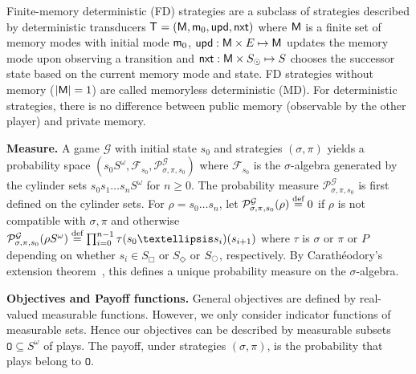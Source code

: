 \documentclass[a4paper,UKenglish,cleveref,autoref,thm-restate]{lipics-v2021}
\newcommand{\+}[1]{\mathbb{#1}}
\newcommand{\?}[1]{\mathcal{#1}}
\newcommand{\x}{\times}
\newcommand{\rsymbol}{\ocircle}
\newcommand{\zsymbol}{\Box}
\newcommand{\osymbol}{\Diamond}
\newcommand{\xsymbol}{\odot}
\newcommand{\zstates}{\states_\zsymbol}
\newcommand{\rstates}{\states_\rsymbol}
\newcommand{\ostates}{\states_\osymbol}
\newcommand{\xstates}{\states_\xsymbol}
\newcommand{\eqby}[2][=]{\stackrel{\text{{\tiny{#2}}}}{#1}}
\newcommand{\eqdef}{\eqby{def}}
\newcommand{\Prob}[2][]{\mathcal{P}^{#1}_{#2}}
\newcommand{\obj}{\mathtt{O}}
\newcommand{\lrc}[1]{\left(#1\right)}
\newcommand{\tuple}[1]{\lrc{#1}}
\newcommand{\game}{{\mathcal G}}
\newcommand{\restrict}{|}
\newcommand{\states}{S}
\newcommand{\s}{s}
\newcommand{\transition}{{E}}
\newcommand{\probp}{P}
\newcommand{\partialplay}{\rho}
\newcommand{\zstrat}{\sigma}
\newcommand{\ostrat}{\pi}
\newcommand{\xstrat}{\tau}
\newcommand{\pz}{\zsymbol}
\newcommand{\po}{\osymbol}
\newcommand{\memory}{{\sf M}}
\newcommand{\updatefun}{upd}
\newcommand{\memconf}{{\sf m}}
\newcommand{\memconfset}{{\sf M}}
\newcommand{\memsuc}{{\sf nxt}}
\newcommand{\memup}{{\sf \updatefun}}
\newcommand{\memstrattuple}{\tuple{\memory,\initmem,\memup,\memsuc}}
\newcommand{\initmem}{\memconf_0}
\newcommand{\memstrat}[1]{{\sf T}^{#1}}
\newcommand{\om}{\omega}
\newcommand{\expectval}{{\mathcal E}}
\newcommand{\expectation}[2][]{ \expectval^{#1}_{#2}}
\newcommand{\F}{{\mathcal F}}
\begin{document}
Finite-memory deterministic (FD) strategies are a subclass of
strategies described by deterministic transducers
$\memstrat{} =\memstrattuple$ where $\memconfset$ is a finite set
of memory modes with initial mode $\memconf_0$,
$\memup : \memconfset \x \transition \mapsto \memconfset$
updates the memory mode upon observing a transition and
$\memsuc : \memconfset \x \xstates \mapsto \states$
chooses the successor state based on the current memory mode and state.
FD strategies without memory ($|\memconfset|=1$) are
called memoryless deterministic (MD).
For deterministic strategies, there is no difference between public memory
(observable by the other player) and private memory.

\textbf{Measure.} A game $\game$ with initial state $\s_0$ and strategies
$(\zstrat,\ostrat)$ yields a probability space
$(\s_0\states^{\om},\F_{\s_0}, \Prob[\game]{\zstrat,\ostrat,\s_0})$
where $\F_{\s_0}$ is the $\sigma$-algebra generated by the cylinder sets
$\s_0\s_1\ldots\s_n\states^{\om}$ for $n \ge 0$.
%
The probability measure $\Prob[\game]{\zstrat,\ostrat,\s_0}$ is
first defined on the cylinder sets.
For $\partialplay = \s_0\ldots\s_n$, let
$\Prob[\game]{\zstrat,\ostrat,\s_0}(\partialplay) \eqdef 0$ if
$\partialplay$ is not compatible with $\zstrat,\ostrat$ and
otherwise 
$\Prob[\game]{\zstrat,\ostrat,\s_0}(\partialplay\states^{\om}) \eqdef
\prod_{i=0}^{n-1} \xstrat(\s_0\ldots\s_i)(\s_{i+1}) $ where $\xstrat$
is $\zstrat$ or $\ostrat$ or $\probp$ depending on
whether $\s_i \in \zstates$ or $\ostates$ or $\rstates$, respectively.
By Carath\'eodory's extension
theorem~\cite{billingsley2008probability}, this defines a unique probability
measure on the $\sigma$-algebra.

\textbf{Objectives and Payoff functions.}
General objectives are defined by real-valued measurable functions.
However, we only consider indicator functions of measurable sets.
Hence our objectives can be described by measurable subsets $\obj \subseteq \states^{\om}$ of plays.
The payoff, under strategies $(\zstrat,\ostrat)$,
is the probability that plays belong to $\obj$.
\end{document}
